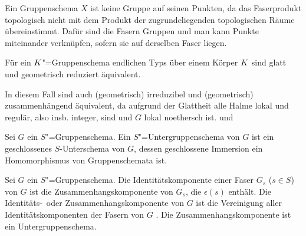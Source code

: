 \documentclass[german]{scrreprt}
\begin{document}
\begin{Definition}[$S$"=Gruppenschema]
  \begin{Bemerkung}
    Ein Gruppenschema $X$ ist keine Gruppe auf seinen Punkten, da das
    Faserprodukt topologisch nicht mit dem Produkt der zugrundeliegenden
    topologischen Räume übereinstimmt.
    Dafür sind die Fasern Gruppen und man kann Punkte miteinander
    verknüpfen, sofern sie auf derselben Faser liegen.
  \end{Bemerkung}

  \begin{Bemerkung}\label{gruppenschemaaequivalenzen}
    Für ein $K$"=Gruppenschema endlichen Typs über einem Körper $K$
    sind glatt und geometrisch reduziert äquivalent.
    \cite[8.5, Excercise 11]{bosch}
    
    In diesem Fall sind auch (geometrisch) irreduzibel und (geometrisch)
    zusammenhängend äquivalent, da aufgrund der Glattheit alle Halme
    lokal und regulär, also insb. integer, sind und $G$ lokal noethersch
    ist.
    \cite[s.][Exercise 3.16]{wedhorn} und \cite[Corollary 16.51]{wedhorn}
  \end{Bemerkung}
\end{Definition}

\begin{Definition}[Untergruppenschema]
  Sei $G$ ein $S$"=Gruppenschema.
  Ein $S$"=Untergruppenschema von $G$ ist ein geschlossenes
  $S$-Unterschema von $G$, dessen geschlossene Immersion ein
  Homomorphismus von Gruppenschemata ist.
  \cite[vgl.][Definition 4.45]{wedhorn}
\end{Definition}

\begin{Definition}[Identitätskomponente]
  Sei $G$ ein $S$"=Gruppenschema.
  Die Identitätskomponente einer Faser $G_s$ ($s\in S$) von $G$ ist
  die Zusammenhangskomponente von $G_s$, die $\epsilon(s)$ enthält.
  Die Identitäts-~oder Zusammenhangskomponente von $G$ ist
  die Vereinigung aller Identitätskomponenten der Fasern von $G$
  \cite[Remark IV.6.1.2]{silverman2}.
  Die Zusammenhangskomponente ist ein Untergruppenschema.
\end{Definition}
\end{document}
